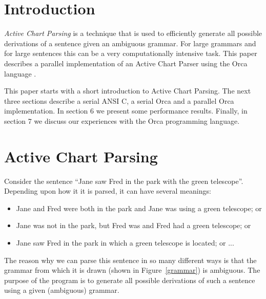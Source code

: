 \section{Introduction}

{\em Active Chart Parsing} is a technique that is used to efficiently generate all
possible derivations of a sentence given an ambiguous grammar. For large
grammars and for large sentences this can be a very computationally
intensive task. This paper describes a parallel implementation of an Active
Chart Parser using the Orca language \cite {orca}.

This paper starts with a
short introduction to Active Chart Parsing. The next three sections
describe a serial ANSI C, a serial Orca and a parallel Orca implementation. In
section 6 we present some performance results. Finally, in section 7
we discuss our experiences with the Orca programming language.

\section{Active Chart Parsing}

Consider the sentence ``Jane saw Fred in the park with the green
telescope''. Depending upon how it it is parsed, it can have several
meanings:
\begin {itemize}
\item
Jane and Fred were both in the park and Jane was using a green telescope; or
\item
Jane was not in the park, but Fred was and Fred had a green telescope; or
\item
Jane saw Fred in the park in which a green telescope is located; or ...
\end{itemize}

The reason why we can parse this sentence in so many different ways is
that the grammar from which it is drawn (shown
in Figure~\ref{grammar}) is ambiguous. The purpose of the program is
to generate all possible derivations of such a sentence using a
given (ambiguous) grammar. 

